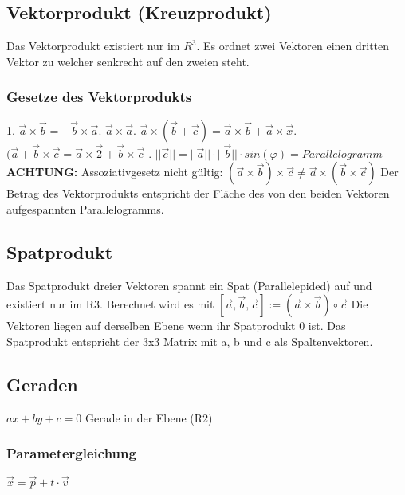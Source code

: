 \documentclass[11pt,a4paper,onecolumn]{scrartcl}
\begin{document}
\begin{flushleft}
\subsection{Vektorprodukt (Kreuzprodukt)}
Das Vektorprodukt existiert nur im $R^{3}$. Es ordnet zwei Vektoren einen dritten Vektor zu welcher senkrecht auf den zweien steht.

\subsubsection{Gesetze des Vektorprodukts}
1. $\vec{a} \times \vec{b} = -\vec{b}\times\vec{a}$. $\vec{a}\times\vec{a}$. $ \vec{a}\times(\vec{b}+\vec{c}) = \vec{a}\times\vec{b}+\vec{a}\times\vec{x}$. $ (\vec{a}+\vec{b}\times\vec{c} = \vec{a}\times\vec{2} + \vec{b}\times\vec{c}$ . $||\vec{c}|| = ||\vec{a}|| \cdot ||\vec{b}|| \cdot sin(\varphi) = Parallelogramm $ \linebreak\linebreak
\textbf{ACHTUNG:} Assoziativgesetz nicht gültig:\linebreak
$(\vec{a}\times\vec{b})\times \vec{c} \neq \vec{a}\times(\vec{b}\times\vec{c})$\linebreak
Der Betrag des Vektorprodukts entspricht der Fläche des von den beiden Vektoren aufgespannten Parallelogramms.


\subsection{Spatprodukt}
Das Spatprodukt dreier Vektoren spannt ein Spat (Parallelepided) auf und existiert nur im R3. Berechnet wird es mit \linebreak
$[\vec{a},\vec{b},\vec{c}] := (\vec{a}\times\vec{b})\circ \vec{c}$ \linebreak
Die Vektoren liegen auf derselben Ebene wenn ihr Spatprodukt 0 ist.\linebreak
Das Spatprodukt entspricht der 3x3 Matrix mit a, b und c als Spaltenvektoren.

\subsection{Geraden}
$ax + by + c = 0 $ Gerade in der Ebene (R2)

\subsubsection{Parametergleichung}
$\vec{x} = \vec{p} + t \cdot \vec{v}$


\end{flushleft}
\end{document}

